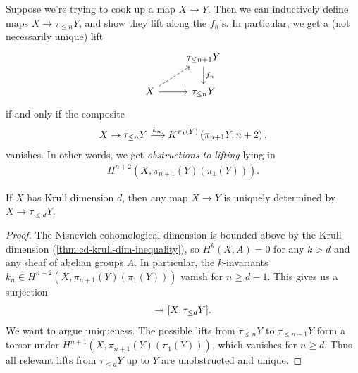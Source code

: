 \documentclass[11pt,openany]{book}
\begin{document}
\begin{example} Suppose we're trying to cook up a map $X \to Y$. Then we can inductively define maps $X \to \tau_{\le n}Y$, and show they lift along the $f_n$'s. In particular, we get a (not necessarily unique) lift
\[ \begin{tikzcd}
     & \tau_{\le n+1}Y\dar["f_n" right]\\
    X\rar\ar[ur,dashed] & \tau_{\le n}Y
\end{tikzcd} \]
if and only if the composite
\begin{align*}
    X \to \tau_{\le n}Y \xrightarrow{k_n} K^{\pi_1(Y)}\left( \pi_{n+1}Y, n+2 \right).
\end{align*}
vanishes. In other words, we get \textit{obstructions to lifting} lying in
\begin{align*}
    H^{n+2}(X, \pi_{n+1}(Y) \left( \pi_1(Y) \right)).
\end{align*}
\end{example}


\begin{theorem}\label{thm:krull-dim-postnikov-truncation} 
If $X$ has Krull dimension $d$, then any map $X \to Y$ is uniquely determined by $X \to \tau_{\le d}Y$.
\end{theorem}
\begin{proof} The Nisnevich cohomological dimension is bounded above by the Krull dimension (\autoref{thm:cd-krull-dim-inequality}), so $H^{k}(X,A) = 0$ for any $k>d$ and any sheaf of abelian groups $A$. In particular, the $k$-invariants $k_n \in H^{n+2}(X, \pi_{n+1}(Y)(\pi_1(Y)))$ vanish for $n \ge d-1$. This gives us a surjection 
\begin{align*}
    [X,Y]\tto [X,\tau_{\le d}Y].
\end{align*}    
We want to argue uniqueness. The possible lifts from $\tau_{\le n}Y$ to $\tau_{\le n+1} Y$ form a torsor under $H^{n+1}(X,\pi_{n+1}(Y)(\pi_1(Y)))$, which vanishes for $n \ge d$. Thus all relevant lifts from $\tau_{\le d} Y$ up to $Y$ are unobstructed and unique.
\end{proof}
\end{document}
